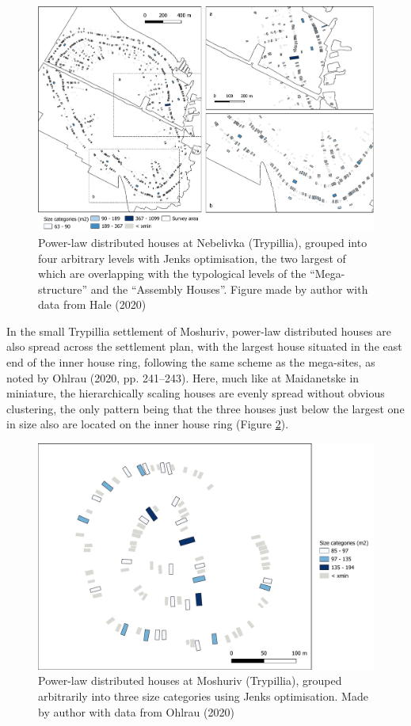 \documentclass[
  12pt,
]{book}
\begin{document}
\begin{figure}
\hypertarget{fig:06-nebelivka-map}{%
\centering
\includegraphics{Results/fig06_nebelivka_pl.pdf}
\caption{Power-law distributed houses at Nebelivka (Trypillia), grouped into four arbitrary levels with Jenks optimisation, the two largest of which are overlapping with the typological levels of the ``Mega-structure'' and the ``Assembly Houses''. Figure made by author with data from Hale (2020)}\label{fig:06-nebelivka-map}
}
\end{figure}

In the small Trypillia settlement of Moshuriv, power-law distributed houses are also spread across the settlement plan, with the largest house situated in the east end of the inner house ring, following the same scheme as the mega-sites, as noted by Ohlrau (2020, pp. 241--243). Here, much like at Maidanetske in miniature, the hierarchically scaling houses are evenly spread without obvious clustering, the only pattern being that the three houses just below the largest one in size also are located on the inner house ring (Figure \ref{fig:06-moshuriv-map}).

\begin{figure}
\hypertarget{fig:06-moshuriv-map}{%
\centering
\includegraphics{Results/fig06_moshuriv_pl.pdf}
\caption{Power-law distributed houses at Moshuriv (Trypillia), grouped arbitrarily into three size categories using Jenks optimisation. Made by author with data from Ohlrau (2020)}\label{fig:06-moshuriv-map}
}
\end{figure}
\end{document}
